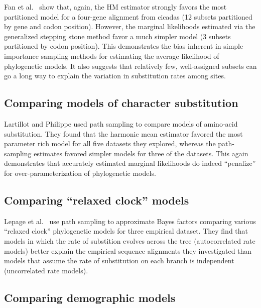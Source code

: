 Fan et al.\ \citeyear{Fan2011} show that, again, the HM estimator strongly
favors the most partitioned model for a four-gene alignment from cicadas (12
subsets partitioned by gene and codon position).
However, the marginal likelihoods estimated via the generalized stepping stone
method favor a much simpler model (3 subsets partitioned by codon position).
This demonstrates the bias inherent in simple importance sampling methods
for estimating the average likelihood of phylogenetic models.
It also suggests that relatively few, well-assigned subsets can go a long way
to explain the variation in substitution rates among sites.

\subsection{Comparing models of character substitution}

Lartillot and Philippe \citeyear{Lartillot2006} used path sampling to compare
models of amino-acid substitution.
They found that the harmonic mean estimator favored the most parameter rich
model for all five datasets they explored, whereas the path-sampling estimates
favored simpler models for three of the datasets.
This again demonstrates that accurately estimated marginal likelihoods do
indeed ``penalize'' for over-parameterization of phylogenetic models.

\subsection{Comparing ``relaxed clock'' models}

Lepage et al.\ \citeyear{Lepage2007} use path sampling to approximate Bayes
factors comparing various ``relaxed clock'' phylogenetic models for
three empirical dataset.
They find that models in which the rate of substition evolves across the tree
(autocorrelated rate models) better explain the empirical sequence alignments
they investigated than models that assume the rate of substitution on each
branch is independent (uncorrelated rate models).

\citep{Baele2012}

\citep{Baele2013MBE}

\subsection{Comparing demographic models}

\citep{Baele2012}


